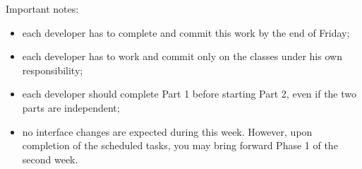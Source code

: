 \documentclass[10p]{article}
\theoremstyle{definition}
\begin{document}
\vspace{2ex}
\noindent Important notes:
\begin{itemize}
  \item each developer has to complete and commit this work by the end of Friday;
  \item each developer has to work and commit only on the classes under his own responsibility;
  \item each developer should complete Part 1 before starting Part 2, even if the two parts are independent;
  \item no interface changes are expected during this week. However, upon
  completion of the scheduled tasks, you may bring forward Phase 1 of the second week.
\end{itemize}
\end{document}
